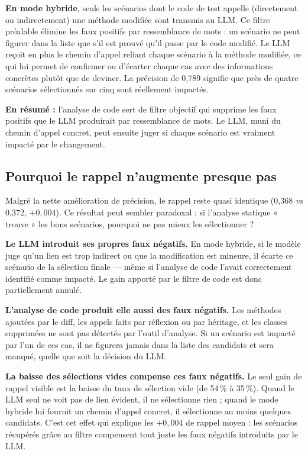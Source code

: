 \documentclass[12pt,a4paper]{article}
\begin{document}
\textbf{En mode hybride}, seuls les scénarios dont le code de test appelle
(directement ou indirectement) une méthode modifiée sont transmis au LLM.
Ce filtre préalable élimine les faux positifs par ressemblance de mots :
un scénario ne peut figurer dans la liste que s'il est prouvé qu'il passe par
le code modifié. Le LLM reçoit en plus le chemin d'appel reliant chaque scénario
à la méthode modifiée, ce qui lui permet de confirmer ou d'écarter chaque cas
avec des informations concrètes plutôt que de deviner. La précision de 0{,}789
signifie que près de quatre scénarios sélectionnés sur cinq sont réellement impactés.

\begin{insight}
\textbf{En résumé :} l'analyse de code sert de filtre objectif qui supprime
les faux positifs que le LLM produirait par ressemblance de mots.
Le LLM, muni du chemin d'appel concret, peut ensuite juger si chaque
scénario est vraiment impacté par le changement.
\end{insight}

\subsection{Pourquoi le rappel n'augmente presque pas}

Malgré la nette amélioration de précision, le rappel reste quasi identique
(0{,}368 \emph{vs} 0{,}372, $+0{,}004$). Ce résultat peut sembler paradoxal :
si l'analyse statique « trouve » les bons scénarios, pourquoi ne pas mieux
les sélectionner ?

\textbf{Le LLM introduit ses propres faux négatifs.} En mode hybride,
si le modèle juge qu'un lien est trop indirect ou que la modification est
mineure, il écarte ce scénario de la sélection finale — même si l'analyse
de code l'avait correctement identifié comme impacté. Le gain apporté par
le filtre de code est donc partiellement annulé.

\textbf{L'analyse de code produit elle aussi des faux négatifs.} Les méthodes
ajoutées par le diff, les appels faits par réflexion ou par héritage, et
les classes supprimées ne sont pas détectés par l'outil d'analyse.
Si un scénario est impacté par l'un de ces cas, il ne figurera jamais dans
la liste des candidats et sera manqué, quelle que soit la décision du LLM.

\textbf{La baisse des sélections vides compense ces faux négatifs.}
Le seul gain de rappel visible est la baisse du taux de sélection vide
(de 54\,\% à 35\,\%). Quand le LLM seul ne voit pas de lien évident, il
ne sélectionne rien ; quand le mode hybride lui fournit un chemin d'appel
concret, il sélectionne au moins quelques candidats. C'est cet effet qui
explique les $+0{,}004$ de rappel moyen : les scénarios récupérés grâce au
filtre compensent tout juste les faux négatifs introduits par le LLM.
\end{document}
